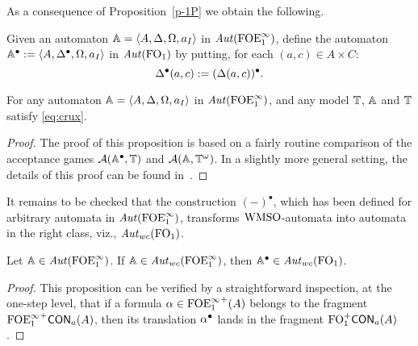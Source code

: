 \noindent{}

As a consequence of Proposition~\ref{p-1P} we obtain the following.

\begin{definition}
Given an automaton $\mathbb{A} = \langle{A,\Delta,\Omega,a_{I}}\rangle$ in $\mathit{Aut}(\mathrm{FOE}^{\infty}_1)$, define 
the automaton $\mathbb{A}^{\bullet} \mathrel{: =} \langle{A,\Delta^{\bullet},\Omega,a_{I}}\rangle$ in 
$\mathit{Aut}(\mathrm{FO}_1)$ by putting, for each $(a,c) \in A \times C$:
\[
\Delta^{\bullet}(a,c) \mathrel{: =} (\Delta(a,c))^{\bullet}.
\]
\end{definition}

\begin{proposition}
For any automaton $\mathbb{A} = \langle{A,\Delta,\Omega,a_{I}}\rangle$ in $\mathit{Aut}(\mathrm{FOE}^{\infty}_1)$, and any
model $\mathbb{T}$, $\mathbb{A}$ and $\mathbb{T}$ satisfy \eqref{eq:crux}.
\end{proposition}

\begin{proof}
The proof of this proposition is based on a fairly routine comparison of the 
acceptance games $\mathcal{A}(\mathbb{A}^{\bullet},\mathbb{T})$ and 
$\mathcal{A}(\mathbb{A},\mathbb{T}^{\omega})$.
In a slightly more general setting, the details of this proof can be found 
in~\cite{Venxx}.
\end{proof}
\medskip

It remains to be checked that the construction $(-)^{\bullet}$, which has
been defined for arbitrary automata in $\mathit{Aut}(\mathrm{FOE}^{\infty}_1)$, transforms 
$\mathrm{WMSO}$-automata into automata in the right class, viz., $\mathit{Aut}_{wc}(\mathrm{FO}_1)$.

\begin{proposition}
Let $\mathbb{A} \in \mathit{Aut}(\mathrm{FOE}^{\infty}_1)$.
If $\mathbb{A} \in \mathit{Aut}_{wc}(\mathrm{FOE}^{\infty}_1)$, then $\mathbb{A}^{\bullet} \in \mathit{Aut}_{wc}(\mathrm{FO}_1)$.
\end{proposition}

\begin{proof}
This proposition can be verified by a straightforward inspection, at the 
one-step level, that if a formula $\alpha \in {\ensuremath{\mathrm{FOE}^{\infty}_1}}^+(A)$ belongs to the fragment 
${\mathrm{FOE}^{\infty}_1}^+\mathsf{CON}_{a}(A)$, then its translation $\alpha^{\bullet}$ lands in 
the fragment $\mathrm{FO}_1^+\mathsf{CON}_{a}(A)$.
\end{proof}


